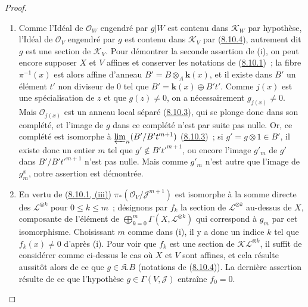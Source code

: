 \begin{proof}
\begin{enumerate}
  \item[\rm{(i)}] Comme l'Idéal de $\mathcal{O}_W$ engendré par $g|W$ est
  contenu dans $\mathcal{K}_W$ par hypothèse, l'Idéal de $\mathcal{O}_V$
  engendré par $g$ est contenu dans $\mathcal{K}_V$ par
  (\hyperref[II.8.10.4-fr]{8.10.4}), autrement dit $g$ est une section de
  $\mathcal{K}_V$. Pour démontrer la seconde assertion de (i), on peut encore
  supposer $X$ et $V$ affines et conserver les notations de
  (\hyperref[II.8.10.1-fr]{8.10.1})~; la fibre $\pi^{-1}(x)$ est alors affine
  d'anneau $B'=B\otimes_A \boldsymbol{k}(x)$, et il existe dans $B'$ un élément $t'$ non
  diviseur de 0 tel que $B'=\boldsymbol{k}(x)\oplus B't'$. Comme $j(x)$ est une
  spécialisation de $z$ et que $g(z)\neq0$, on a nécessairement
  $g_{j(x)}\neq0$. Mais $\mathcal{O}_{j(x)}$ est un anneau local séparé
  (\hyperref[II.8.10.3-fr]{8.10.3}), qui se plonge donc dans son complété, et
  l'image de $g$ dans ce complété n'est par suite pas nulle. Or, ce complété
  est isomorphe à $\varprojlim_n(B'/B't'^{n+1})$
  (\hyperref[II.8.10.3-fr]{8.10.3})~; si $g'=g\otimes1\in B'$, il existe donc
  un entier $m$ tel que $g'\notin B't'^{m+1}$, ou encore l'image $g'_m$ de
  $g'$ dans $B'/B't'^{m+1}$ n'est pas nulle. Mais comme $g'_m$ n'est autre que
  l'image de $g_m^x$, notre assertion est démontrée.
  \item[\rm{(ii)}] En vertu de
  (\hyperref[II.8.10.1-fr]{8.10.1, (iii)})
  $\pi_*(\mathcal{O}_V/\mathcal{J}^{m+1})$ est isomorphe à la somme directe
  des $\mathcal{L}^{\otimes k}$ pour $0\leqslant k\leqslant m$~; désignons
  par $f_k$ la section de $\mathcal{L}^{\otimes k}$ au-dessus de $X$,
  composante de l'élément de
  $\bigoplus_{k=0}^m\Gamma(X,\mathcal{L}^{\otimes k})$ qui correspond à $g_m$
  par cet isomorphisme. Choisissant $m$ comme dans (i), il y a donc un indice
  $k$ tel que $f_k(x)\neq0$ d'après (i). Pour voir que $f_k$ est une section
  de $\mathcal{K}\mathcal{L}^{\otimes k}$, il suffit de considérer comme
  ci-dessus le cas où $X$ et $V$ sont affines, et cela résulte aussitôt alors
  de ce que $g\in\mathfrak{K}.B$ (notations de
  (\hyperref[II.8.10.4-fr]{8.10.4})). La dernière assertion résulte de ce que
  l'hypothèse $g\in\Gamma(V,\mathcal{J})$ entraîne $f_0=0$.
\end{enumerate}
\end{proof}

